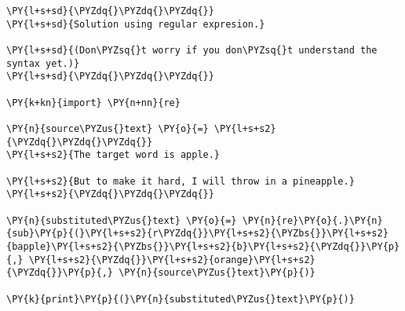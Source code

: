 

\section*{}

\begin{Verbatim}[commandchars=\\\{\}]
\PY{l+s+sd}{\PYZdq{}\PYZdq{}\PYZdq{}}
\PY{l+s+sd}{Solution using regular expresion.}

\PY{l+s+sd}{(Don\PYZsq{}t worry if you don\PYZsq{}t understand the syntax yet.)}
\PY{l+s+sd}{\PYZdq{}\PYZdq{}\PYZdq{}}

\PY{k+kn}{import} \PY{n+nn}{re}

\PY{n}{source\PYZus{}text} \PY{o}{=} \PY{l+s+s2}{\PYZdq{}\PYZdq{}\PYZdq{}}
\PY{l+s+s2}{The target word is apple.}

\PY{l+s+s2}{But to make it hard, I will throw in a pineapple.}
\PY{l+s+s2}{\PYZdq{}\PYZdq{}\PYZdq{}}

\PY{n}{substituted\PYZus{}text} \PY{o}{=} \PY{n}{re}\PY{o}{.}\PY{n}{sub}\PY{p}{(}\PY{l+s+s2}{r\PYZdq{}}\PY{l+s+s2}{\PYZbs{}}\PY{l+s+s2}{bapple}\PY{l+s+s2}{\PYZbs{}}\PY{l+s+s2}{b}\PY{l+s+s2}{\PYZdq{}}\PY{p}{,} \PY{l+s+s2}{\PYZdq{}}\PY{l+s+s2}{orange}\PY{l+s+s2}{\PYZdq{}}\PY{p}{,} \PY{n}{source\PYZus{}text}\PY{p}{)}

\PY{k}{print}\PY{p}{(}\PY{n}{substituted\PYZus{}text}\PY{p}{)}
\end{Verbatim}
